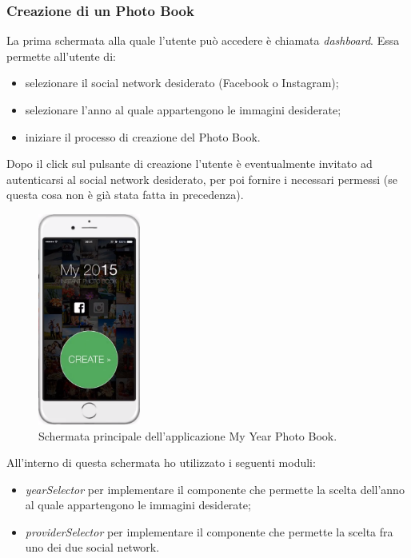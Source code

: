 			\subsubsection{Creazione di un Photo Book}
				La prima schermata alla quale l'utente può accedere è chiamata \emph{dashboard}. Essa permette all'utente di:
				\begin{itemize}
					\item selezionare il social network desiderato (Facebook o Instagram);
					\item selezionare l'anno al quale appartengono le immagini desiderate;
					\item iniziare il processo di creazione del Photo Book.
				\end{itemize}
				Dopo il click sul pulsante di creazione l'utente è eventualmente invitato ad autenticarsi al social network
				desiderato, per poi fornire i necessari permessi (se questa cosa non è già stata fatta in precedenza).
				\begin{figure}[H]
					\centering
					\includegraphics[width=0.3\textwidth]{capitolo_3/immagini/schermata_principale.png}
					\caption{Schermata principale dell'applicazione My Year Photo Book.}
				\end{figure}
				All'interno di questa schermata ho utilizzato i seguenti moduli:
				\begin{itemize}
					\item \emph{yearSelector} per implementare il componente che permette la scelta dell'anno al quale
					appartengono le immagini desiderate;
					\item \emph{providerSelector} per implementare il componente che permette la scelta fra uno dei due social
					network.
				\end{itemize}
